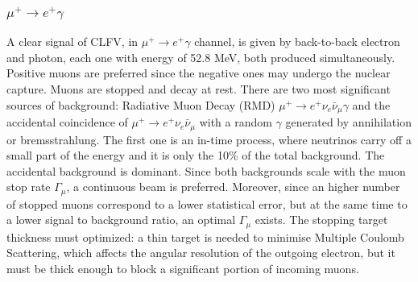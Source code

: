 \subsubsection{$\mu^+ \rightarrow e^+ \gamma$}
A clear signal of CLFV, in $\mu^+ \rightarrow e^+ \gamma$ channel, is given by back-to-back electron and photon, each one with energy of 52.8 MeV, 
both produced simultaneously. Positive muons are preferred since the negative ones may undergo the nuclear capture. 
Muons are stopped and decay at rest. There are two most significant sources of background: Radiative Muon Decay (RMD) $\mu^+ \rightarrow e^+ \nu_e \bar{\nu}_\mu \gamma$ 
and the accidental coincidence of $\mu^+ \rightarrow e^+ \nu_e \bar{\nu}_\mu$ with a random $\gamma$ 
generated by annihilation or bremsstrahlung. The first one is an in-time process, where neutrinos carry off a small part of the energy 
and it is only the 10\% of the total background. The accidental background is dominant. Since both backgrounds scale with the muon stop rate $\Gamma_\mu$, a continuous beam is preferred. 
Moreover, since an higher number of stopped muons correspond to a lower statistical error, but at the same time to a lower signal to background ratio, an optimal $\Gamma_\mu$ exists.
The stopping target thickness must optimized: a thin target is needed to minimise Multiple Coulomb Scattering, which affects the angular resolution of the outgoing electron, but 
it must be thick enough to block a significant portion of incoming muons. 
